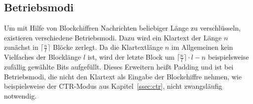 \subsection{Betriebsmodi}
Um mit Hilfe von Blockchiffren Nachrichten beliebiger Länge zu verschlüsseln, existieren verschiedene Betriebsmodi. Dazu wird ein Klartext der Länge $n$ zunächst in $\lceil \frac{n}{l} \rceil$ Blöcke zerlegt. Da die Klartextlänge $n$ im Allgemeinen kein Vielfaches der Blocklänge $l$ ist, wird der letzte Block um $\lceil \frac{n}{l} \rceil  \cdot l - n$ beispielsweise zufällig gewählte Bits aufgefüllt. Dieses Erweitern heißt Padding und ist bei Betriebsmodi, die nicht den Klartext als Eingabe der Blockchiffre nehmen, wie beispielsweise der CTR-Modus aus Kapitel~\ref{ssec:ctr}, nicht zwangsläufig notwendig.


